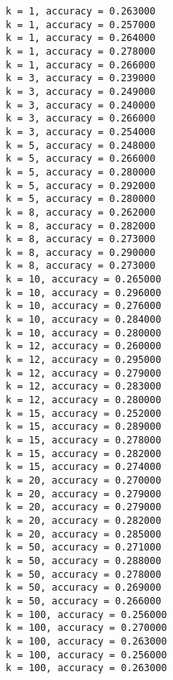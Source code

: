 \documentclass[11pt]{article}
\begin{document}
    \begin{Verbatim}[commandchars=\\\{\}]
k = 1, accuracy = 0.263000
k = 1, accuracy = 0.257000
k = 1, accuracy = 0.264000
k = 1, accuracy = 0.278000
k = 1, accuracy = 0.266000
k = 3, accuracy = 0.239000
k = 3, accuracy = 0.249000
k = 3, accuracy = 0.240000
k = 3, accuracy = 0.266000
k = 3, accuracy = 0.254000
k = 5, accuracy = 0.248000
k = 5, accuracy = 0.266000
k = 5, accuracy = 0.280000
k = 5, accuracy = 0.292000
k = 5, accuracy = 0.280000
k = 8, accuracy = 0.262000
k = 8, accuracy = 0.282000
k = 8, accuracy = 0.273000
k = 8, accuracy = 0.290000
k = 8, accuracy = 0.273000
k = 10, accuracy = 0.265000
k = 10, accuracy = 0.296000
k = 10, accuracy = 0.276000
k = 10, accuracy = 0.284000
k = 10, accuracy = 0.280000
k = 12, accuracy = 0.260000
k = 12, accuracy = 0.295000
k = 12, accuracy = 0.279000
k = 12, accuracy = 0.283000
k = 12, accuracy = 0.280000
k = 15, accuracy = 0.252000
k = 15, accuracy = 0.289000
k = 15, accuracy = 0.278000
k = 15, accuracy = 0.282000
k = 15, accuracy = 0.274000
k = 20, accuracy = 0.270000
k = 20, accuracy = 0.279000
k = 20, accuracy = 0.279000
k = 20, accuracy = 0.282000
k = 20, accuracy = 0.285000
k = 50, accuracy = 0.271000
k = 50, accuracy = 0.288000
k = 50, accuracy = 0.278000
k = 50, accuracy = 0.269000
k = 50, accuracy = 0.266000
k = 100, accuracy = 0.256000
k = 100, accuracy = 0.270000
k = 100, accuracy = 0.263000
k = 100, accuracy = 0.256000
k = 100, accuracy = 0.263000

    \end{Verbatim}
\end{document}
